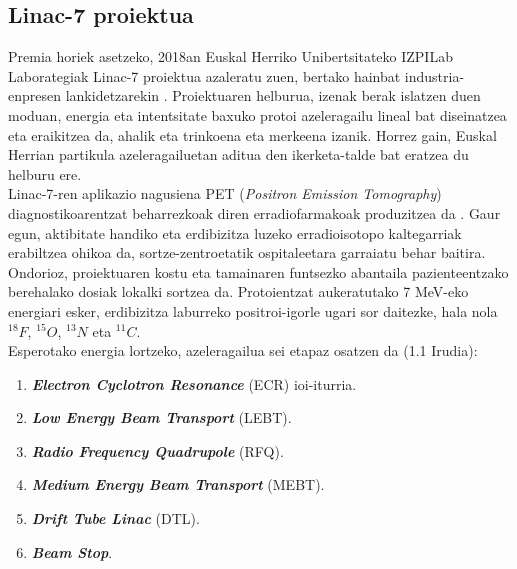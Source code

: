 \documentclass[12pt]{article}
\numberwithin{figure}{section}
\numberwithin{equation}{section}
\begin{document}
\subsection{Linac-7 proiektua}
\label{sec:sarrera}
Premia horiek asetzeko, 2018an Euskal Herriko Unibertsitateko IZPILab Laborategiak Linac-7 proiektua azaleratu zuen, bertako hainbat industria-enpresen lankidetzarekin \cite{feuchtwanger_new_2022}. Proiektuaren helburua, izenak berak islatzen duen moduan, energia eta intentsitate baxuko protoi azeleragailu lineal bat diseinatzea eta eraikitzea da, ahalik eta trinkoena eta merkeena izanik. Horrez gain, Euskal Herrian partikula azeleragailuetan aditua den ikerketa-talde bat eratzea du helburu ere.\\

Linac-7-ren aplikazio nagusiena PET (\textit{Positron Emission Tomography}) diagnostikoarentzat beharrezkoak diren erradiofarmakoak produzitzea da \cite{victor_etxebarria_manufacturing_2022}. Gaur egun, aktibitate handiko eta erdibizitza luzeko erradioisotopo kaltegarriak erabiltzea ohikoa da, sortze-zentroetatik ospitaleetara garraiatu behar baitira. Ondorioz, proiektuaren kostu eta tamainaren funtsezko abantaila pazienteentzako berehalako dosiak lokalki sortzea da. Protoientzat aukeratutako 7 MeV-eko energiari esker, erdibizitza laburreko positroi-igorle ugari sor daitezke, hala nola $^{18}F$, $^{15}O$, $^{13}N$ eta $^{11}C$.\\

Esperotako energia lortzeko, azeleragailua sei etapaz osatzen da (1.1 Irudia):
\begin{enumerate}[itemsep=0em, topsep=0.8em]
    \item \textbf{\textit{Electron Cyclotron Resonance}} (ECR) ioi-iturria.
    \item \textbf{\textit{Low Energy Beam Transport}} (LEBT).
    \item \textbf{\textit{Radio Frequency Quadrupole}} (RFQ).
    \item \textbf{\textit{Medium Energy Beam Transport}} (MEBT).
    \item \textbf{\textit{Drift Tube Linac}} (DTL).
    \item \textbf{\textit{Beam Stop}}.
\end{enumerate}
\end{document}
